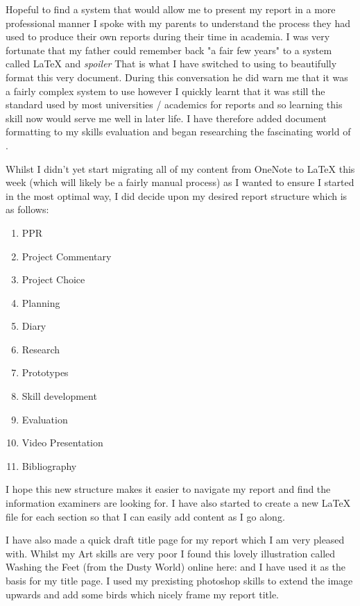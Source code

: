 Hopeful to find a system that would allow me to present my report in a more professional manner I spoke with my parents to understand the process they had used to produce their own reports during their time in academia. I was very fortunate that my father could remember back "a fair few years" to a system called \LaTeX{} and \textit{spoiler} That is what I have switched to using to beautifully format this very document. During this conversation he did warn me that it was a fairly complex system to use however I quickly learnt that it was still the standard used by most universities / academics for reports and so learning this skill now would serve me well in later life. I have therefore added document formatting to my skills evaluation and began researching the fascinating world of .

Whilst I didn't yet start migrating all of my content from OneNote to \LaTeX{} this week (which will likely be a fairly manual process) as I wanted to ensure I started in the most optimal way, I did decide upon my desired report structure which is as follows:

\begin{enumerate}
    \item PPR
    \item Project Commentary
    \item Project Choice
    \item Planning
    \item Diary
    \item Research
    \item Prototypes
    \item Skill development
    \item Evaluation
    \item Video Presentation
    \item Bibliography
\end{enumerate}

I hope this new structure makes it easier to navigate my report and find the information examiners are looking for. I have also started to create a new \LaTeX{} file for each section so that I can easily add content as I go along.

I have also made a quick draft title page for my report which I am very pleased with. Whilst my Art skills are very poor I found this lovely illustration called Washing the Feet (from the Dusty World) online here: \cite{WashingFeetDusty} and I have used it as the basis for my title page. I used my prexisting photoshop skills to extend the image upwards and add some birds which nicely frame my report title.

